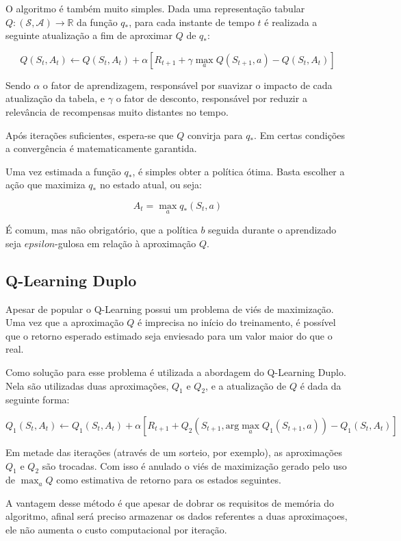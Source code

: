 O algoritmo é também muito simples. Dada uma representação tabular $Q: (\mathcal{S},\mathcal{A}) \to \mathbb{R}$ da função $q_*$, para cada instante de tempo $t$ é realizada a seguinte atualização a fim de aproximar $Q$ de $q_*$:

\begin{equation}
Q(S_t, A_t) \leftarrow Q(S_t, A_t) + \alpha[R_{t+1} + \gamma\max_{a} Q(S_{t+1}, a) - Q(S_t, A_t)]
\end{equation}

Sendo $\alpha$ o fator de aprendizagem, responsável por suavizar o impacto de cada atualização da tabela, e $\gamma$ o fator de desconto, responsável por reduzir a relevância de recompensas muito distantes no tempo.

Após iterações suficientes, espera-se que $Q$ convirja para $q_*$. Em certas condições a convergência é matematicamente garantida.

Uma vez estimada a função $q_*$, é simples obter a política ótima. Basta escolher a ação que maximiza $q_*$ no estado atual, ou seja:

\begin{equation}
A_{t} = \max_{a} q_*(S_t, a)
\end{equation}

É comum, mas não obrigatório, que a política $b$ seguida durante o aprendizado seja $epsilon$-gulosa em relação à aproximação $Q$.

\subsection{Q-Learning Duplo}
\label{subsec:dq-theory}
Apesar de popular o Q-Learning possui um problema de viés de maximização. Uma vez que a aproximação $Q$ é imprecisa no início do treinamento, é possível que o retorno esperado estimado seja enviesado para um valor maior do que o real.

Como solução para esse problema é utilizada a abordagem do Q-Learning Duplo. Nela são utilizadas duas aproximações, $Q_1$ e $Q_2$, e a atualização de $Q$ é dada da seguinte forma:

\begin{equation}
\label{eq:doubleq}
Q_1(S_t, A_t) \leftarrow Q_1(S_t, A_t) + \alpha[R_{t+1} + Q_2(S_{t+1}, \text{arg}\max_a Q_1(S_{t+1}, a)) - Q_1(S_t, A_t)]
\end{equation}

Em metade das iterações (através de um sorteio, por exemplo), as aproximações $Q_1$ e $Q_2$ são trocadas. Com isso é anulado o viés de maximização gerado pelo uso de $\max_a Q$ como estimativa de retorno para os estados seguintes.

A vantagem desse método é que apesar de dobrar os requisitos de memória do algoritmo, afinal será preciso armazenar os dados referentes a duas aproximaçoes, ele não aumenta o custo computacional por iteração.
